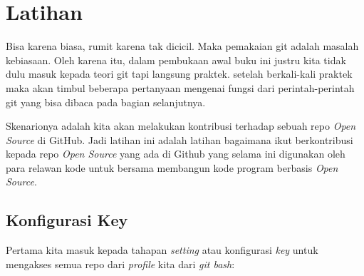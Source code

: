 \section{Latihan}

Bisa karena biasa, rumit karena tak dicicil. Maka pemakaian git adalah masalah kebiasaan. Oleh karena itu, dalam pembukaan awal buku ini justru kita tidak dulu masuk kepada teori git tapi langsung praktek. setelah berkali-kali praktek maka akan timbul beberapa pertanyaan mengenai fungsi dari perintah-perintah git yang bisa dibaca pada bagian selanjutnya.


Skenarionya adalah kita akan melakukan kontribusi terhadap sebuah repo \textit{Open Source} di GitHub. Jadi latihan ini adalah latihan bagaimana ikut berkontribusi kepada repo \textit{Open Source} yang ada di Github yang selama ini digunakan oleh para relawan kode untuk bersama membangun kode program berbasis \textit{Open Source}.
\subsection{Konfigurasi Key}
Pertama kita masuk kepada tahapan \textit{setting} atau konfigurasi \textit{key} untuk mengakses semua repo dari \textit{profile} kita dari \textit{git bash}:

